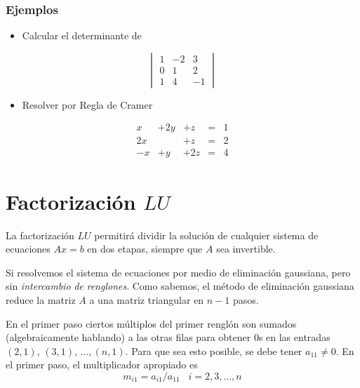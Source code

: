\documentclass[
]{article}
\providecommand{\tightlist}{%
  \setlength{\itemsep}{0pt}\setlength{\parskip}{0pt}}
\begin{document}
\hypertarget{ejemplos-2}{%
\subsubsection{Ejemplos}\label{ejemplos-2}}

\begin{itemize}
\tightlist
\item
  Calcular el determinante de
\end{itemize}

\[
\begin{vmatrix} 1 & -2 & 3 \\ 0 & 1 & 2 \\ 1 & 4 & -1  \end{vmatrix}
\]

\begin{itemize}
\tightlist
\item
  Resolver por Regla de Cramer
\end{itemize}

\begin{equation}
\begin{array}{cccccc}
     x & +2y   &+z  & = & 1       \\ 
     2x &      &+z  & = & 2       \\
     -x & + y  &+2z & = & 4
\end{array}
\end{equation}

\hypertarget{factorizaciuxf3n-lu-1}{%
\section{\texorpdfstring{Factorización
\(LU\)}{Factorización LU}}\label{factorizaciuxf3n-lu-1}}

La factorización \(LU\) permitirá dividir la solución de cualquier
sistema de ecuaciones \(Ax=b\) en dos etapas, siempre que \(A\) sea
invertible.

Si resolvemos el sistema de ecuaciones por medio de eliminación
gaussiana, pero sin \emph{intercambio} \emph{de} \emph{renglones}. Como
sabemos, el método de eliminación gaussiana reduce la matriz \(A\) a una
matriz triangular en \(n-1\) pasos.

En el primer paso ciertos múltiplos del primer renglón son sumados
(algebraicamente hablando) a las otras filas para obtener 0s en las
entradas \((2,1),\,(3,1),\,\ldots,(n,1)\). Para que sea esto posible, se
debe tener \(a_{11} \ne 0\). En el primer paso, el multiplicador
apropiado es \begin{equation}
m_{i1} = a_{i1}/a_{11}\,\,\,\,\,i=2,3,\ldots,n
\end{equation}
\end{document}
